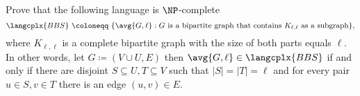Prove that the following language is $\NP$-complete
$$
    \langcplx{BBS} ~\coloneqq~ \{\avg{G, \ell} : \text{$G$ is a bipartite graph that contains $K_{\ell,
        \ell}$ as a subgraph}\},
$$
where $K_{\ell, \ell}$ is a complete bipartite graph with the size of both parts equals $\ell$. In other
words, let $G \coloneqq (V \cup U, E)$ then $\avg{G, \ell} \in \langcplx{BBS}$ if and only if there are
disjoint $S \subseteq U, T \subseteq V$ such that $|S| = |T| = \ell$ and for every pair $u \in S, v \in
T$ there is an edge $(u, v) \in E$.